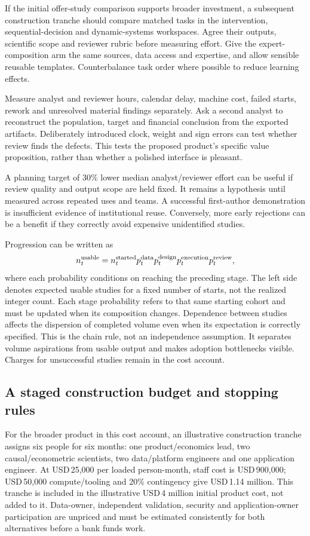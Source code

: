 If the initial offer-study comparison supports broader investment,
a subsequent construction tranche should compare matched tasks in the
intervention, sequential-decision and dynamic-systems workspaces. Agree their outputs,
scientific scope and reviewer rubric before measuring effort. Give the
expert-composition arm the same sources, data access and expertise, and
allow sensible reusable templates. Counterbalance task order where
possible to reduce learning effects.

Measure analyst and reviewer hours, calendar delay, machine cost,
failed starts, rework and unresolved material findings separately.
Ask a second analyst to reconstruct the population, target and financial
conclusion from the exported artifacts. Deliberately introduced clock,
weight and sign errors can test whether review finds the defects.
This tests the proposed product's specific value proposition, rather
than whether a polished interface is pleasant.

A planning target of 30\% lower median analyst/reviewer effort can be
useful if review quality and output scope are held fixed. It remains
a hypothesis until measured across repeated uses and teams. A successful
first-author demonstration is insufficient evidence of institutional
reuse. Conversely, more early rejections can be a benefit if they
correctly avoid expensive unidentified studies.

Progression can be written as
\[
 n_t^{\rm usable}=n_t^{\rm started}
 p_t^{\rm data}p_t^{\rm design}p_t^{\rm execution}p_t^{\rm review},
\]
where each probability conditions on reaching the preceding stage.
The left side denotes expected usable studies for a fixed number of
starts, not the realized integer count. Each stage probability refers
to that same starting cohort and must be updated when its composition
changes. Dependence between studies affects the dispersion of completed
volume even when its expectation is correctly specified.
This is the chain rule, not an independence assumption. It separates
volume aspirations from usable output and makes adoption bottlenecks
visible. Charges for unsuccessful studies remain in the cost account.

\subsection{A staged construction budget and stopping rules}
\label{r3:investment-sequence}

For the broader product in this cost account, an illustrative construction
tranche assigns six people for six months:
one product/economics lead, two causal/econometric scientists, two
data/platform engineers and one application engineer. At USD\,25,000
per loaded person-month, staff cost is USD\,900,000; USD\,50,000
compute/tooling and 20\% contingency give USD\,1.14 million.
This tranche is included in the illustrative USD\,4 million initial
product cost, not added to it. Data-owner, independent validation,
security and application-owner participation are unpriced and must
be estimated consistently for both alternatives before a bank funds work.

